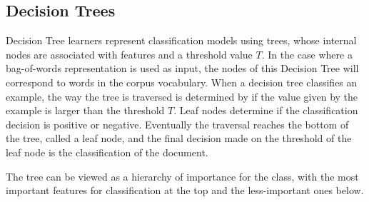 


\subsection{Decision Trees}\label{bg:trees}

Decision Tree learners represent classification models using trees, whose internal nodes are associated with features and  a  threshold value $T$. In the case where a bag-of-words representation is used as input, the nodes of this Decision Tree will correspond to  words in the corpus vocabulary. When a decision tree classifies an example, the way the tree is traversed is determined by if the value given by the example is larger than the threshold $T$. Leaf nodes determine if the classification decision is positive or negative. Eventually the traversal reaches the bottom of the tree, called a leaf node, and the final  decision made on the threshold of the leaf node is the classification of the document. 

The tree can be viewed as a hierarchy of importance for the class, with the most important features for classification at the top and the less-important ones below. %




